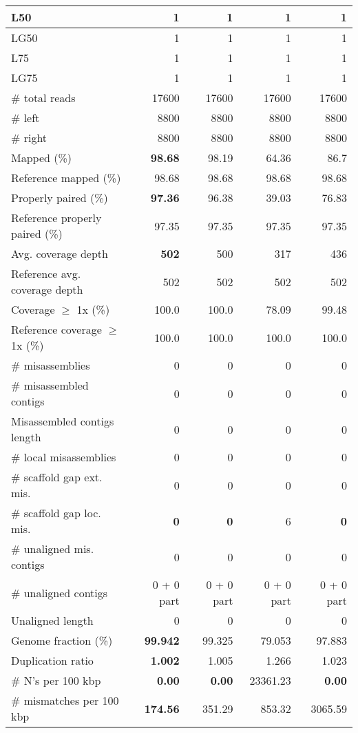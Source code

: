\documentclass[12pt,a4paper]{article}
\begin{document}
\begin{table}[ht]
\begin{center}
\begin{tabular}{|l*{4}{|r}|}
L50 & 1 & 1 & 1 & 1 \\ \hline
LG50 & 1 & 1 & 1 & 1 \\ \hline
L75 & 1 & 1 & 1 & 1 \\ \hline
LG75 & 1 & 1 & 1 & 1 \\ \hline
\# total reads & 17600 & 17600 & 17600 & 17600 \\ \hline
\# left & 8800 & 8800 & 8800 & 8800 \\ \hline
\# right & 8800 & 8800 & 8800 & 8800 \\ \hline
Mapped (\%) & {\bf 98.68} & 98.19 & 64.36 & 86.7 \\ \hline
Reference mapped (\%) & 98.68 & 98.68 & 98.68 & 98.68 \\ \hline
Properly paired (\%) & {\bf 97.36} & 96.38 & 39.03 & 76.83 \\ \hline
Reference properly paired (\%) & 97.35 & 97.35 & 97.35 & 97.35 \\ \hline
Avg. coverage depth & {\bf 502} & 500 & 317 & 436 \\ \hline
Reference avg. coverage depth & 502 & 502 & 502 & 502 \\ \hline
Coverage $\geq$ 1x (\%) & 100.0 & 100.0 & 78.09 & 99.48 \\ \hline
Reference coverage $\geq$ 1x (\%) & 100.0 & 100.0 & 100.0 & 100.0 \\ \hline
\# misassemblies & 0 & 0 & 0 & 0 \\ \hline
\# misassembled contigs & 0 & 0 & 0 & 0 \\ \hline
Misassembled contigs length & 0 & 0 & 0 & 0 \\ \hline
\# local misassemblies & 0 & 0 & 0 & 0 \\ \hline
\# scaffold gap ext. mis. & 0 & 0 & 0 & 0 \\ \hline
\# scaffold gap loc. mis. & {\bf 0} & {\bf 0} & 6 & {\bf 0} \\ \hline
\# unaligned mis. contigs & 0 & 0 & 0 & 0 \\ \hline
\# unaligned contigs & 0 + 0 part & 0 + 0 part & 0 + 0 part & 0 + 0 part \\ \hline
Unaligned length & 0 & 0 & 0 & 0 \\ \hline
Genome fraction (\%) & {\bf 99.942} & 99.325 & 79.053 & 97.883 \\ \hline
Duplication ratio & {\bf 1.002} & 1.005 & 1.266 & 1.023 \\ \hline
\# N's per 100 kbp & {\bf 0.00} & {\bf 0.00} & 23361.23 & {\bf 0.00} \\ \hline
\# mismatches per 100 kbp & {\bf 174.56} & 351.29 & 853.32 & 3065.59 \\ \hline

\end{tabular}
\end{center}
\end{table}
\end{document}
